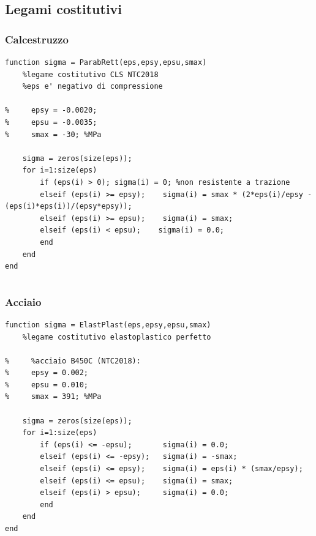 \documentclass[10pt]{article}
\begin{document}
\subsection{Legami costitutivi}

\subsubsection{Calcestruzzo}

\begin{lstlisting}[caption=\footnotesize legame costitutivo parabola-rettangolo per il calcestruzzo armato (\texttt{ParabRett.m})]
function sigma = ParabRett(eps,epsy,epsu,smax)
    %legame costitutivo CLS NTC2018
    %eps e' negativo di compressione
    
%     epsy = -0.0020;
%     epsu = -0.0035;
%     smax = -30; %MPa
    
    sigma = zeros(size(eps));
    for i=1:size(eps)
        if (eps(i) > 0); sigma(i) = 0; %non resistente a trazione
        elseif (eps(i) >= epsy); 	sigma(i) = smax * (2*eps(i)/epsy - (eps(i)*eps(i))/(epsy*epsy));
        elseif (eps(i) >= epsu); 	sigma(i) = smax;
        elseif (eps(i) < epsu);    sigma(i) = 0.0;
        end
    end
end
\end{lstlisting}

\begin{lstlisting}[caption=\footnotesize legame costitutivo parabola-rettangolo per il calcestruzzo armato con la definizione anche della resistenza a trazione (\texttt{ParabRett2.m})]

\end{lstlisting}



\subsubsection{Acciaio}

\begin{lstlisting}[caption=\footnotesize legame costitutivo elasto-plastico perfetto per l'acciaio (\texttt{ElaspPlast.m})]
function sigma = ElastPlast(eps,epsy,epsu,smax)
    %legame costitutivo elastoplastico perfetto
    
%     %acciaio B450C (NTC2018):
%     epsy = 0.002;
%     epsu = 0.010;
%     smax = 391; %MPa
    
    sigma = zeros(size(eps));
    for i=1:size(eps)
        if (eps(i) <= -epsu);		sigma(i) = 0.0;
        elseif (eps(i) <= -epsy);	sigma(i) = -smax;
        elseif (eps(i) <= epsy); 	sigma(i) = eps(i) * (smax/epsy); 
        elseif (eps(i) <= epsu); 	sigma(i) = smax; 
        elseif (eps(i) > epsu); 	sigma(i) = 0.0;
        end
    end
end
\end{lstlisting}
\end{document}

